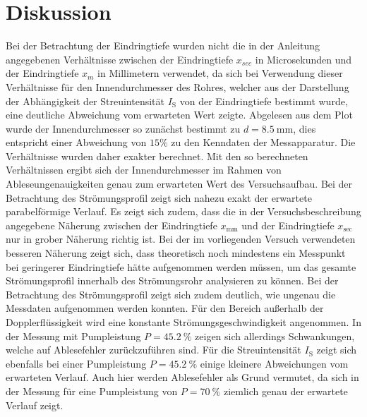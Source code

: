 \section{Diskussion}
\label{sec:Diskussion}
Bei der Betrachtung der Eindringtiefe wurden nicht die in der Anleitung angegebenen Verhältnisse zwischen der Eindringtiefe $x_{sec}$ in Microsekunden und der Eindringtiefe $x_{m}$ in Millimetern verwendet, da sich bei Verwendung dieser Verhältnisse für den Innendurchmesser des Rohres, welcher aus der Darstellung der Abhängigkeit der Streuintensität $I_{\mathrm{S}}$ von der Eindringtiefe bestimmt wurde, eine deutliche Abweichung vom erwarteten Wert zeigte.
Abgelesen aus dem Plot wurde der Innendurchmesser so zunächst bestimmt zu $d=\SI{8.5}{\milli\meter}$, dies entspricht einer Abweichung von $15\%$ zu den Kenndaten der Messapparatur.
Die Verhältnisse wurden daher exakter berechnet. Mit den so berechneten Verhältnissen ergibt sich der Innendurchmesser im Rahmen von Ableseungenauigkeiten genau zum erwarteten Wert des Versuchsaufbau.
Bei der Betrachtung des Strömungsprofil zeigt sich nahezu exakt der erwartete parabelförmige Verlauf. Es zeigt sich zudem, dass die in der Versuchsbeschreibung angegebene Näherung zwischen der Eindringtiefe $x_\mathrm{mm}$ und der Eindringtiefe $x_\mathrm{sec}$ nur in grober Näherung richtig ist. Bei der im vorliegenden Versuch verwendeten besseren Näherung zeigt sich, dass theoretisch noch mindestens ein Messpunkt bei geringerer Eindringtiefe hätte aufgenommen werden müssen, um das gesamte Strömungsprofil innerhalb des Strömungsrohr analysieren zu können.
Bei der Betrachtung des Strömungsprofil zeigt sich zudem deutlich, wie ungenau die Messdaten aufgenommen werden konnten. Für den Bereich außerhalb der Dopplerflüssigkeit wird eine konstante Strömungsgeschwindigkeit angenommen. In der Messung mit Pumpleistung $P=\SI{45.2}{\percent}$ zeigen sich allerdings Schwankungen, welche auf Ablesefehler zurückzuführen sind.
Für die Streuintensität $I_\mathrm{S}$ zeigt sich ebenfalls bei einer Pumpleistung $P=\SI{45.2}{\percent}$ einige kleinere Abweichungen vom erwarteten Verlauf. Auch hier werden Ablesefehler als Grund vermutet, da sich in der Messung für eine Pumpleistung von $P=\SI{70}{\percent}$ ziemlich genau der erwartete Verlauf zeigt.
